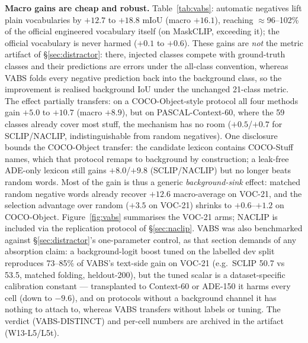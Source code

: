 \documentclass[11pt]{article}
\newcommand{\miou}{mIoU}
\begin{document}
\textbf{Macro gains are cheap and robust.} Table~\ref{tab:vabs}: automatic negatives
lift plain vocabularies by $+12.7$ to $+18.8$ \miou{} (macro $+16.1$), reaching
$\approx$96--102\% of the official engineered vocabulary itself (on MaskCLIP, exceeding it);
the official vocabulary is never harmed ($+0.1$ to $+0.6$). These gains are
\emph{not} the metric artifact of \S\ref{sec:distractor}: there, injected classes
compete with ground-truth classes and their predictions are errors under the
all-class convention, whereas VABS folds every negative prediction back into the
background class, so the improvement is realised background IoU under the unchanged
21-class metric. The effect partially transfers: on a COCO-Object-style protocol all
four methods gain $+5.0$ to $+10.7$ (macro $+8.9$), but on PASCAL-Context-60, where
the 59 classes already cover most stuff, the mechanism has no room ($+0.5$/$+0.7$
for SCLIP/NACLIP, indistinguishable from random negatives). One disclosure bounds
the COCO-Object transfer: the candidate lexicon contains COCO-Stuff names, which
that protocol remaps to background by construction; a leak-free ADE-only lexicon
still gains $+8.0$/$+9.8$ (SCLIP/NACLIP) but no longer beats random words. Most of
the gain is thus a generic \emph{background-sink} effect: matched random negative
words already recover $+12.6$ macro-average on VOC-21, and the selection advantage
over random ($+3.5$ on VOC-21) shrinks to $+0.6$--$+1.2$ on COCO-Object.
Figure~\ref{fig:vabs} summarises the VOC-21 arms; NACLIP is included via the
replication protocol of \S\ref{sec:naclip}.
VABS was also benchmarked against \S\ref{sec:distractor}'s one-parameter
control, as that section demands of any absorption claim: a
background-logit boost tuned on the labelled dev split reproduces 73--85\%
of VABS's text-side gain on VOC-21 (e.g.\ SCLIP 50.7 vs 53.5, matched
folding, heldout-200), but the tuned scalar is a dataset-specific
calibration constant --- transplanted to Context-60 or ADE-150 it harms
every cell (down to $-9.6$), and on protocols without a background channel
it has nothing to attach to, whereas VABS transfers without labels or
tuning. The verdict (VABS-DISTINCT) and per-cell numbers are archived in
the artifact (W13-L5/L5t).
\end{document}
